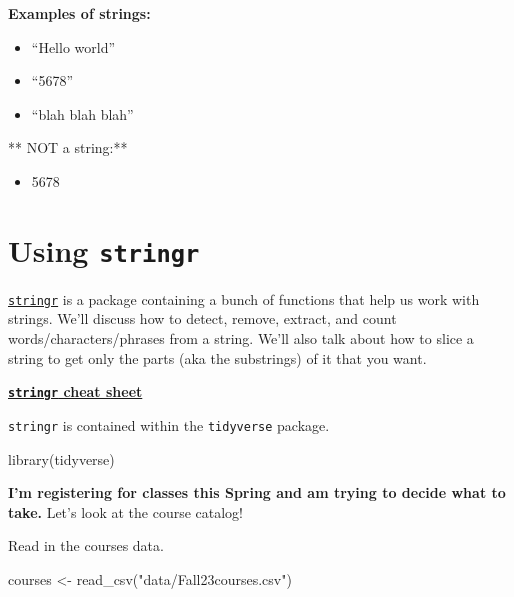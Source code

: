 \documentclass[
  letterpaper,
  DIV=11,
  numbers=noendperiod]{scrartcl}
\newenvironment{Shaded}{\begin{snugshade}}{\end{snugshade}}
\newcommand{\FunctionTok}[1]{\textcolor[rgb]{0.28,0.35,0.67}{#1}}
\newcommand{\NormalTok}[1]{\textcolor[rgb]{0.00,0.23,0.31}{#1}}
\newcommand{\OtherTok}[1]{\textcolor[rgb]{0.00,0.23,0.31}{#1}}
\newcommand{\StringTok}[1]{\textcolor[rgb]{0.13,0.47,0.30}{#1}}
\providecommand{\tightlist}{%
  \setlength{\itemsep}{0pt}\setlength{\parskip}{0pt}}\usepackage{longtable,booktabs,array}
\begin{document}
\textbf{Examples of strings:}

\begin{itemize}
\tightlist
\item
  ``Hello world''
\item
  ``5678''
\item
  ``blah blah blah''
\end{itemize}

** NOT a string:**

\begin{itemize}
\tightlist
\item
  5678
\end{itemize}

\hypertarget{using-stringr}{%
\section{\texorpdfstring{Using
\texttt{stringr}}{Using stringr}}\label{using-stringr}}

\href{https://stringr.tidyverse.org/}{\texttt{stringr}} is a package
containing a bunch of functions that help us work with strings. We'll
discuss how to detect, remove, extract, and count
words/characters/phrases from a string. We'll also talk about how to
slice a string to get only the parts (aka the substrings) of it that you
want.

\href{https://evoldyn.gitlab.io/evomics-2018/ref-sheets/R_strings.pdf}{\textbf{\texttt{stringr}
cheat sheet}}

\texttt{stringr} is contained within the \texttt{tidyverse} package.

\begin{Shaded}
\begin{Highlighting}[]
\FunctionTok{library}\NormalTok{(tidyverse)}
\end{Highlighting}
\end{Shaded}

\textbf{I'm registering for classes this Spring and am trying to decide
what to take.} Let's look at the course catalog!

Read in the courses data.

\begin{Shaded}
\begin{Highlighting}[]
\NormalTok{courses }\OtherTok{\textless{}{-}} \FunctionTok{read\_csv}\NormalTok{(}\StringTok{"data/Fall23courses.csv"}\NormalTok{)}
\end{Highlighting}
\end{Shaded}
\end{document}
